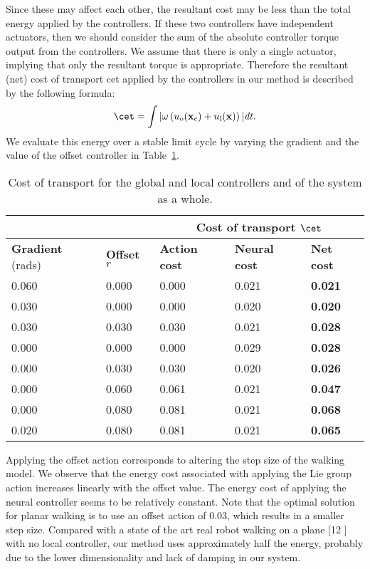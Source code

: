 Since these may affect each other, the resultant cost may be less than the total energy applied by the controllers. 
If these two controllers have independent actuators, then we should consider the sum of the absolute controller torque output from the controllers. 
We assume that there is only a single actuator, implying that only the resultant torque is appropriate.
Therefore the resultant (net) cost of transport cet  applied by the controllers in our method  is described by the following formula:
\begin{equation}
\cet = \int | \omega \left(\uout(\x_c) + \ulocal(\x)\right)| \mathit{dt}.
\end{equation}
We evaluate this energy over a stable limit cycle by varying the gradient and the value of the offset controller in Table~\ref{tab:energy}.
\begin{table}[htbp]
 \centering
 \begin{tabular}{|l|l|l|l|l|}\hline
  \multicolumn{2}{|c|}{}&\multicolumn{3}{|c|}{\textbf{Cost of transport} $\cet$}\\\hline
  \textbf{Gradient} (rads)&\textbf{Offset} $r$&\textbf{Action cost}&\textbf{Neural cost}&\textbf{Net cost}\\ \hline
  0.060&0.000&0.000&0.021&\textbf{0.021}\\
  0.030&0.000&0.000&0.020&\textbf{0.020}\\
  0.030&0.030&0.030&0.021&\textbf{0.028}\\  
  0.000&0.000&0.000&0.029&\textbf{0.028}\\
  0.000&0.030&0.030&0.020&\textbf{0.026}\\
  0.000&0.060&0.061&0.021&\textbf{0.047}\\
  0.000&0.080&0.081&0.021&\textbf{0.068}\\
  0.020&0.080&0.081&0.021&\textbf{0.065}\\\hline
 \end{tabular}
 \caption{\label{tab:energy}Cost of transport for the global and local controllers and of the system as a whole.}
\end{table}
 Applying the offset action corresponds to altering the step size of the walking model. 
 We observe that the energy cost associated with applying the Lie group action increases linearly with the offset value. 
 The energy cost of applying the neural controller seems to be relatively constant. Note that the optimal solution for planar walking is to use an offset action of 0.03, which results in a smaller step size. 
 Compared with a state of the art real robot walking on a plane [12 ] with no local controller, our method uses approximately half the energy, probably due to the lower dimensionality and lack of damping in our system.
